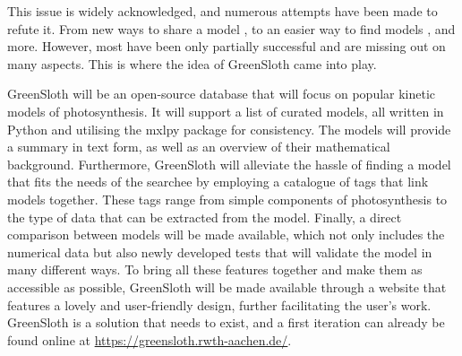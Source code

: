 \documentclass[11pt]{article}
\begin{document}
This issue is widely acknowledged, and numerous attempts have been made to refute it. From new ways to share a model \parencite{hucka_systems_2003}, to an easier way to find models \parencite{malik-sheriff_biomodels15_2019}, and more. However, most have been only partially successful and are missing out on many aspects. This is where the idea of GreenSloth came into play.

GreenSloth will be an open-source database that will focus on popular kinetic models of photosynthesis. It will support a list of curated models, all written in Python and utilising the mxlpy package \parencite{van_aalst_mxlpy_2025} for consistency. The models will provide a summary in text form, as well as an overview of their mathematical background. Furthermore, GreenSloth will alleviate the hassle of finding a model that fits the needs of the searchee by employing a catalogue of tags that link models together. These tags range from simple components of photosynthesis to the type of data that can be extracted from the model. Finally, a direct comparison between models will be made available, which not only includes the numerical data but also newly developed tests that will validate the model in many different ways. To bring all these features together and make them as accessible as possible, GreenSloth will be made available through a website that features a lovely and user-friendly design, further facilitating the user's work. GreenSloth is a solution that needs to exist, and a first iteration can already be found online at \url{https://greensloth.rwth-aachen.de/}.

\newpage

\printbibliography
\end{document}
